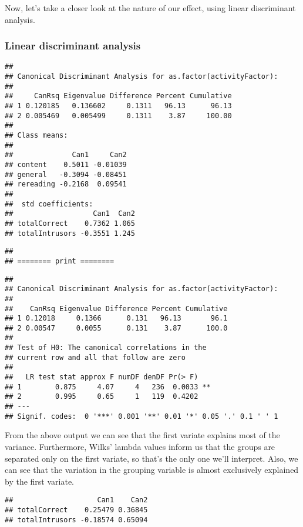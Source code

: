 \documentclass[12pt,]{article}
\begin{document}
Now, let's take a closer look at the nature of our effect, using linear
discriminant analysis.

\hypertarget{linear-discriminant-analysis}{%
\subsubsection{Linear discriminant
analysis}\label{linear-discriminant-analysis}}

\begin{verbatim}
## 
## Canonical Discriminant Analysis for as.factor(activityFactor):
## 
##     CanRsq Eigenvalue Difference Percent Cumulative
## 1 0.120185   0.136602     0.1311   96.13      96.13
## 2 0.005469   0.005499     0.1311    3.87     100.00
## 
## Class means:
## 
##              Can1     Can2
## content    0.5011 -0.01039
## general   -0.3094 -0.08451
## rereading -0.2168  0.09541
## 
##  std coefficients:
##                   Can1  Can2
## totalCorrect    0.7362 1.065
## totalIntrusors -0.3551 1.245
\end{verbatim}

\begin{verbatim}
## 
## ======== print ========
\end{verbatim}

\begin{verbatim}
## 
## Canonical Discriminant Analysis for as.factor(activityFactor):
## 
##    CanRsq Eigenvalue Difference Percent Cumulative
## 1 0.12018     0.1366      0.131   96.13       96.1
## 2 0.00547     0.0055      0.131    3.87      100.0
## 
## Test of H0: The canonical correlations in the 
## current row and all that follow are zero
## 
##   LR test stat approx F numDF denDF Pr(> F)   
## 1        0.875     4.07     4   236  0.0033 **
## 2        0.995     0.65     1   119  0.4202   
## ---
## Signif. codes:  0 '***' 0.001 '**' 0.01 '*' 0.05 '.' 0.1 ' ' 1
\end{verbatim}

From the above output we can see that the first variate explains most of
the variance. Furthermore, Wilks' lambda values inform us that the
groups are separated only on the first variate, so that's the only one
we'll interpret. Also, we can see that the variation in the grouping
variable is almost exclusively explained by the first variate.

\begin{verbatim}
##                    Can1    Can2
## totalCorrect    0.25479 0.36845
## totalIntrusors -0.18574 0.65094
\end{verbatim}
\end{document}
